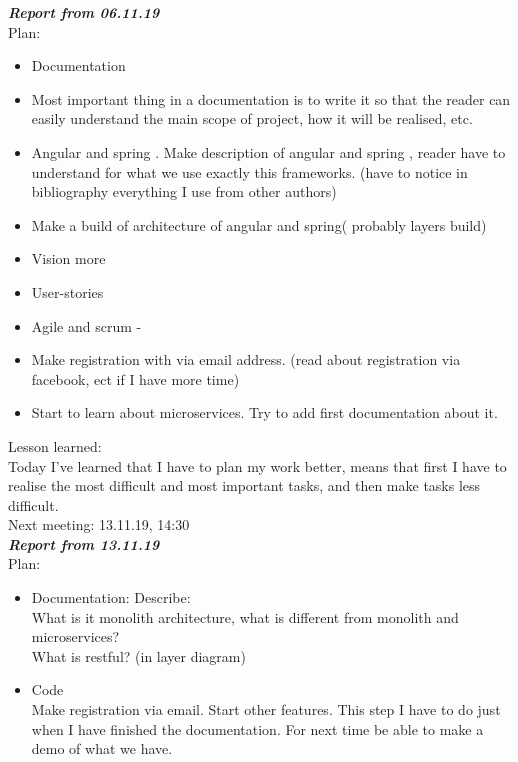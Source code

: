 \documentclass{scrartcl}
\begin{document}
\textbf{\textit{Report from 06.11.19}}\\
Plan:\\
\begin{itemize}


	\item	Documentation
	\item	Most important thing in a documentation is to write it so that the reader can easily understand the main scope of project, how it will be realised, etc.  
	\item	Angular and spring . Make description of angular and spring , reader have to understand for what we use exactly this frameworks. (have to notice in bibliography everything I use from other authors)
	\item	Make a build of architecture of angular and spring( probably layers build)
	\item	Vision more
	\item	User-stories
	\item	Agile and scrum -\/
	\item	Make registration with via email address. (read about registration via facebook, ect if I have more time)
	\item	 Start to learn about microservices. Try to add first documentation about it. 
\end{itemize}
Lesson learned:\\
Today I’ve learned that I have to plan my work better, means that first I have to realise the most difficult and most important tasks, and then make tasks less difficult. \\
 
Next meeting: 13.11.19, 14:30\\





\textbf{\textit{Report from 13.11.19}}\\

Plan:\\
\begin{itemize}
	\item	Documentation: 
Describe:\\
        What is it monolith architecture, what is different from monolith and microservices?\\
       What is restful? (in layer diagram)\\
	\item	Code \\
Make registration via email. Start other features. This step I have to do just when I have finished the documentation.
For next time be able to make a demo of what we have.
\end{itemize}
\end{document}
